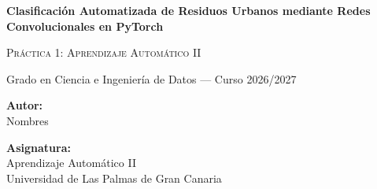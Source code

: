 \documentclass[11pt,a4paper]{article}
\begin{document}
\begin{titlepage}
    \centering
    \vspace*{1.2cm}
    
    {\Huge \bfseries \color{primaryblue} Clasificación Automatizada de Residuos Urbanos mediante Redes Convolucionales en PyTorch \par}
    
    \vspace{0.8cm}
    {\Large \textsc{Práctica 1: Aprendizaje Automático II} \par}
    {\large Grado en Ciencia e Ingeniería de Datos --- Curso 2026/2027 \par}
    
    \vspace{2.5cm}
    
    \begin{minipage}{0.48\textwidth}
        \begin{flushleft} \large
            \textbf{Autor:} \\
            Nombres
        \end{flushleft}
    \end{minipage}
    \begin{minipage}{0.48\textwidth}
        \begin{flushright} \large
            \textbf{Asignatura:} \\
            Aprendizaje Automático II \\
            Universidad de Las Palmas de Gran Canaria
        \end{flushright}
    \end{minipage}
    
    \vspace{3.0cm}
    

\end{titlepage}
\end{document}
